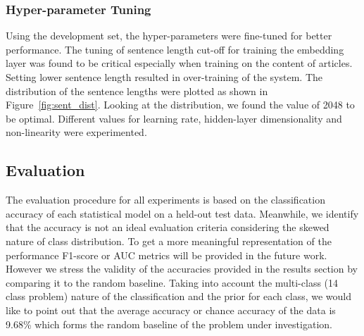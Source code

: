 \documentclass[12pt]{article}
\begin{document}
\subsubsection{Hyper-parameter Tuning}
Using the development set, the hyper-parameters were fine-tuned for better performance. The tuning of sentence length cut-off for training the embedding layer was found to be critical especially when training on the content of articles. Setting lower sentence length resulted in over-training of the system. The distribution of the sentence lengths were plotted as shown in Figure~\ref{fig:sent_dist}. Looking at the distribution, we found the value of 2048 to be optimal. Different values for learning rate, hidden-layer dimensionality and non-linearity were experimented. 



\subsection{Evaluation}
The evaluation procedure for all experiments is based on the classification accuracy of each statistical model on a held-out test data. Meanwhile, we identify that the accuracy is not an ideal evaluation criteria considering the skewed nature of class distribution. To get a more meaningful representation of the performance F1-score or AUC metrics will be provided in the future work. However we stress the validity of the accuracies provided in the results section by comparing it to the random baseline. Taking into account the multi-class (14 class problem) nature of the classification and the prior for each class, we would like to point out that the average accuracy or chance accuracy of the data is 9.68\% which forms the random baseline of the problem under investigation.
\end{document}
